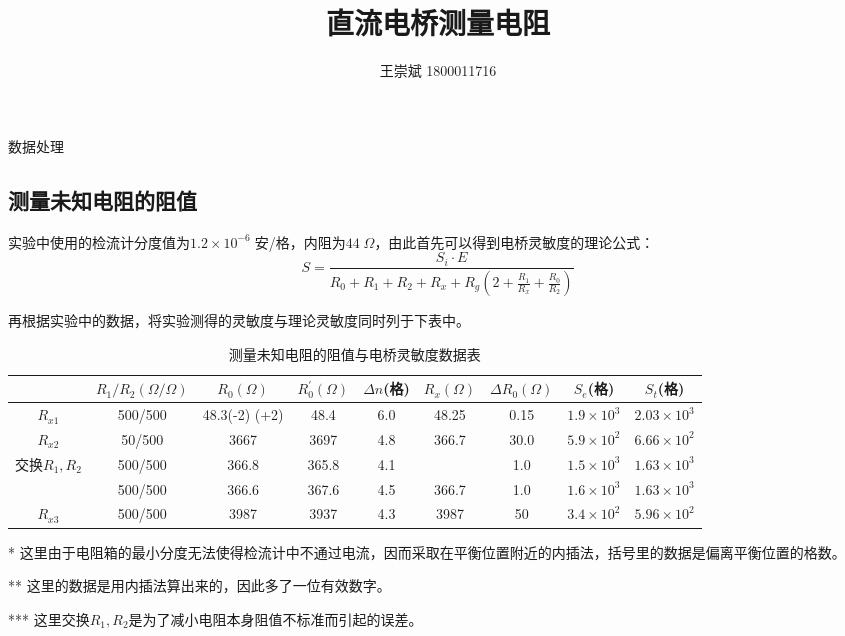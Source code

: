 \documentclass[a4paper]{ctexart}
\title{\textbf{直流电桥测量电阻}}
\author{王崇斌 1800011716}
\date{}
\makeatletter
\renewcommand{\section}{\@startsection{section}{1}{0mm}
	{-\baselineskip}{0.5\baselineskip}{\bf\leftline}}
\makeatother
\begin{document}
	\pagestyle{fancy}
	\chead{}
	\rhead{}
	\maketitle
    \thispagestyle{fancy}
    \section{\large{数据处理}}
    \subsection{测量未知电阻的阻值}
    \par 
    实验中使用的检流计分度值为$1.2 \times 10^{-6}\;$安/格，内阻为$44\;\Omega$，由此首先可以得到电桥灵敏度的理论公式：
    $$
    S=\frac{S_{i} \cdot E}{R_{0}+R_{1}+R_{2}+R_{x}+R_{g}\left(2+\frac{R_{1}}{R_{x}}+\frac{R_{0}}{R_{2}}\right)}
    $$
    \par 
    再根据实验中的数据，将实验测得的灵敏度与理论灵敏度同时列于下表中。
    \begin{table}[htbp]
        \centering
        \caption{测量未知电阻的阻值与电桥灵敏度数据表}
        \begin{threeparttable}
        \begin{tabular}{ccccccccc}
            \toprule[1.5pt]
                 &  $R_{1}/R_{2}(\Omega/\Omega)$ & $R_{0}(\Omega)$ & $R_{0}^{'}(\Omega)$ & $\Delta n$(格) & $R_{x}(\Omega)$ & $\Delta R_{0}(\Omega)$ & $S_{e}$(格) & $S_{t}$(格)\\
            \midrule
            $R_{x1}$ & 500/500 & 48.3(-2)\tnote{*} \; 48.2(+2) & 48.4 & 6.0 & 48.25\tnote{**} & 0.15 & $1.9 \times 10^{3}$ & $2.03 \times 10^{3}$\\
            \midrule
            $R_{x2}$ & 50/500  & 3667 & 3697 & 4.8 & 366.7 & 30.0 & $5.9\times 10^{2}$ & $6.66 \times 10^{2}$\\
            交换$R_{1},R_{2}$\tnote{***} & 500/500 & 366.8 & 365.8 & 4.1 & & 1.0 & $1.5\times 10^{3}$ & $1.63 \times 10^{3}$\\
                              & 500/500 & 366.6 & 367.6 & 4.5 & 366.7 & 1.0 & $1.6\times 10^3$ & $1.63 \times 10^{3}$\\
            \midrule
            $R_{x3}$ & 500/500 & 3987 & 3937 & 4.3 & 3987 & 50 &  $3.4 \times 10^2$ & $5.96 \times 10^{2}$\\
            \bottomrule[1.5pt]
        \end{tabular}
        \begin{tablenotes}
            \item{*} 这里由于电阻箱的最小分度无法使得检流计中不通过电流，因而采取在平衡位置附近的内插法，括号里的数据是偏离平衡位置的格数。
            \item {**} 这里的数据是用内插法算出来的，因此多了一位有效数字。
            \item {***} 这里交换$R_{1},R_{2}$是为了减小电阻本身阻值不标准而引起的误差。
        \end{tablenotes}      
    \end{threeparttable}
    \end{table}
\end{document}
